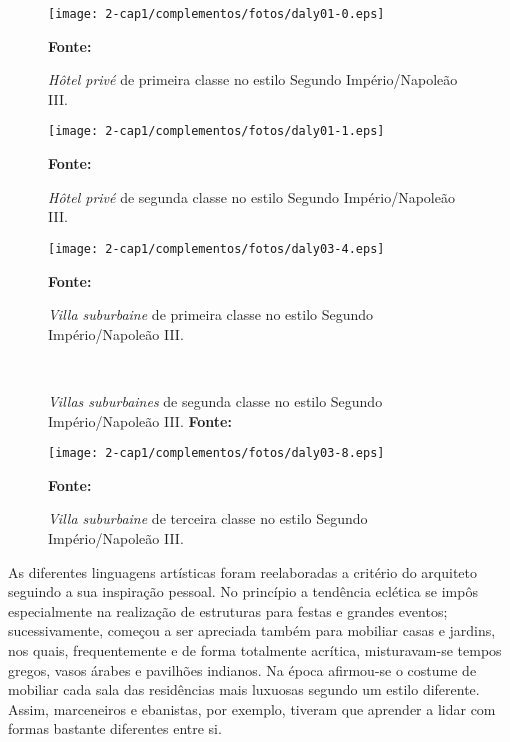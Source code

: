 \begin{figure}[!htp]
\centering
\texttt{[image: 2-cap1/complementos/fotos/daly01-0.eps]}
\label{fig:hotelprimclas} 
\caption{\textit{Hôtel privé} de primeira classe no estilo Segundo Império/Napoleão III.} \textbf{Fonte:} 
\end{figure}

\begin{figure}[!htp]
\centering
\texttt{[image: 2-cap1/complementos/fotos/daly01-1.eps]}
\label{fig:hotelsegclas} 
\caption{\textit{Hôtel privé} de segunda classe no estilo Segundo Império/Napoleão III.} \textbf{Fonte:} 
\end{figure}

\begin{figure}[!htp]
\centering
\texttt{[image: 2-cap1/complementos/fotos/daly03-4.eps]}
\label{fig:villaprimclas} 
\caption{\textit{Villa suburbaine} de primeira classe no estilo Segundo Império/Napoleão III.} \textbf{Fonte:} 
\end{figure}

\begin{figure}[!htp]
\centering
{}
\  %
\caption{\textit{Villas suburbaines} de segunda classe no estilo Segundo Império/Napoleão III. \textbf{Fonte:} }
\end{figure}

\begin{figure}[!htp]
\centering
\texttt{[image: 2-cap1/complementos/fotos/daly03-8.eps]}
\label{fig:villaprimclas} 
\caption{\textit{Villa suburbaine} de terceira classe no estilo Segundo Império/Napoleão III.} \textbf{Fonte:} 
\end{figure}

As diferentes linguagens artísticas foram reelaboradas a critério do arquiteto seguindo a sua inspiração pessoal. No princípio a tendência eclética se impôs especialmente na realização de estruturas para festas e grandes eventos; sucessivamente, começou a ser apreciada também para mobiliar casas e jardins, nos quais, frequentemente e de forma totalmente acrítica, misturavam-se tempos gregos, vasos árabes e pavilhões indianos. Na época afirmou-se o costume de mobiliar cada sala das residências mais luxuosas segundo um estilo diferente. Assim, marceneiros e ebanistas, por exemplo, tiveram que aprender a lidar com formas bastante diferentes entre si. 

